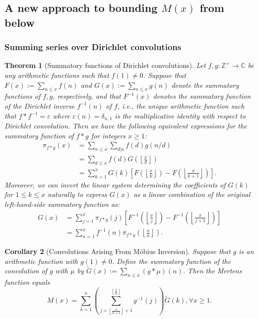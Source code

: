 \documentclass[11pt,reqno,a4letter]{article}
\numberwithin{figure}{section}
\numberwithin{table}{section}
\newcommand{\floor}[1]{\left\lfloor #1 \right\rfloor}
\newcommand{\Floor}[2]{\ensuremath{\left\lfloor \frac{#1}{#2} \right\rfloor}}
\theoremstyle{plain}
\newtheorem{theorem}{Theorem}
\newtheorem{cor}[theorem]{Corollary}
\numberwithin{theorem}{section}
\theoremstyle{definition}
\begin{document}
\subsection{A new approach to bounding $M(x)$ from below} 

\subsubsection{Summing series over Dirichlet convolutions} 

\begin{theorem}[Summatory functions of Dirichlet convolutions] 
\label{theorem_SummatoryFuncsOfDirCvls} 
Let $f,g: \mathbb{Z}^{+} \rightarrow \mathbb{C}$ be any arithmetic functions such that $f(1) \neq 0$. 
Suppose that $F(x) := \sum_{n \leq x} f(n)$ and $G(x) := \sum_{n \leq x} g(n)$ denote the summatory 
functions of $f,g$, respectively, and that $F^{-1}(x)$ denotes the summatory function of the 
Dirichlet inverse $f^{-1}(n)$ of $f$, i.e., the unique arithmetic function such that 
$f \ast f^{-1} = \varepsilon$ where $\varepsilon(n) = \delta_{n,1}$ is the multiplicative identity 
with respect to Dirichlet convolution. Then we have the following equivalent expressions for the 
summatory function of $f \ast g$ for integers $x \geq 1$: 
\begin{align*} 
\pi_{f \ast g}(x) & = \sum_{n \leq x} \sum_{d|n} f(d) g(n/d) \\ 
     & = \sum_{d \leq x} f(d) G\left(\Floor{x}{d}\right) \\ 
     & = \sum_{k=1}^{x} G(k) \left[F\left(\Floor{x}{k}\right) - 
     F\left(\Floor{x}{k+1}\right)\right]. 
\end{align*} 
Moreover, we can invert the linear system determining the coefficients of $G(k)$ for $1 \leq k \leq x$ 
naturally to express $G(x)$ as a linear combination of the original left-hand-side summatory function as:
\begin{align*} 
G(x) & = \sum_{j=1}^{x} \pi_{f \ast g}(j) \left[F^{-1}\left(\Floor{x}{j}\right) - 
     F^{-1}\left(\Floor{x}{j+1}\right)\right] \\ 
     & = \sum_{n=1}^{x} f^{-1}(n) \pi_{f \ast g}\left(\Floor{x}{n}\right). 
\end{align*} 
\end{theorem} 

\begin{cor}[Convolutions Arising From M\"obius Inversion] 
\label{cor_CvlGAstMu} 
Suppose that $g$ is an arithmetic function with $g(1) \neq 0$. Define the summatory function of 
the convolution of $g$ with $\mu$ by $\widetilde{G}(x) := \sum_{n \leq x} (g \ast \mu)(n)$. 
Then the Mertens function equals 
\[
M(x) = \sum_{k=1}^{x} \left(\sum_{j=\floor{\frac{x}{k+1}}+1}^{\floor{\frac{x}{k}}} g^{-1}(j)\right) 
     \widetilde{G}(k), \forall x \geq 1. 
\]
\end{cor} 
\end{document}
